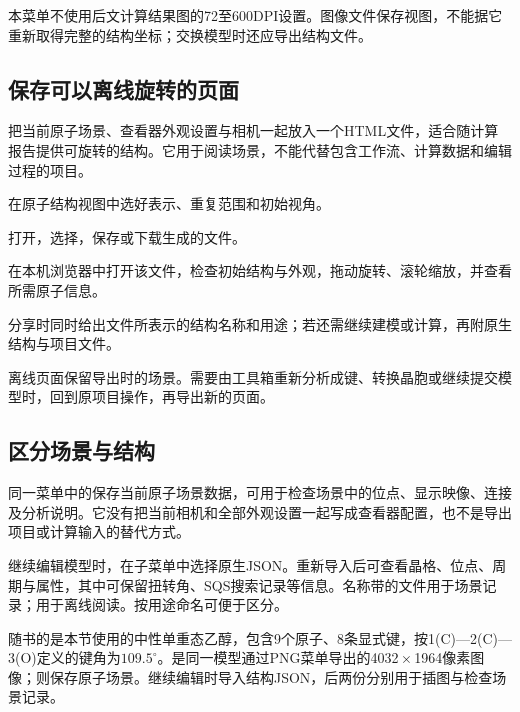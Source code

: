 本菜单不使用后文计算结果图的72至600DPI设置。图像文件保存视图，不能据它重新取得完整的结构坐标；交换模型时还应导出结构文件。



\subsection{保存可以离线旋转的页面}

把当前原子场景、查看器外观设置与相机一起放入一个HTML文件，适合随计算报告提供可旋转的结构。它用于阅读场景，不能代替包含工作流、计算数据和编辑过程的项目。

\begin{steps}
\item 在原子结构视图中选好表示、重复范围和初始视角。
\item 打开，选择，保存或下载生成的文件。
\item 在本机浏览器中打开该文件，检查初始结构与外观，拖动旋转、滚轮缩放，并查看所需原子信息。
\item 分享时同时给出文件所表示的结构名称和用途；若还需继续建模或计算，再附原生结构与项目文件。
\end{steps}

离线页面保留导出时的场景。需要由工具箱重新分析成键、转换晶胞或继续提交模型时，回到原项目操作，再导出新的页面。

\subsection{区分场景与结构}

同一菜单中的保存当前原子场景数据，可用于检查场景中的位点、显示映像、连接及分析说明。它没有把当前相机和全部外观设置一起写成查看器配置，也不是导出项目或计算输入的替代方式。

继续编辑模型时，在子菜单中选择原生JSON。重新导入后可查看晶格、位点、周期与属性，其中可保留扭转角、SQS搜索记录等信息。名称带的文件用于场景记录；用于离线阅读。按用途命名可便于区分。

随书的是本节使用的中性单重态乙醇，包含9个原子、8条显式键，按1(C)—2(C)—3(O)定义的键角为$109.5^\circ$。\mbox{}是同一模型通过PNG菜单导出的4032\,$\times$\,1964像素图像；则保存原子场景。继续编辑时导入结构JSON，后两份分别用于插图与检查场景记录。


